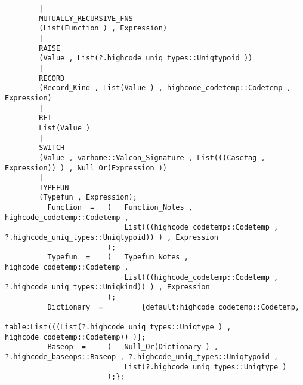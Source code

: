 \begin{verbatim}
        |
        MUTUALLY_RECURSIVE_FNS
        (List(Function ) , Expression)
        |
        RAISE
        (Value , List(?.highcode_uniq_types::Uniqtypoid ))
        |
        RECORD
        (Record_Kind , List(Value ) , highcode_codetemp::Codetemp , Expression)
        |
        RET
        List(Value )
        |
        SWITCH
        (Value , varhome::Valcon_Signature , List(((Casetag , Expression)) ) , Null_Or(Expression ))
        |
        TYPEFUN
        (Typefun , Expression);
          Function  =   (   Function_Notes , highcode_codetemp::Codetemp ,
                            List(((highcode_codetemp::Codetemp , ?.highcode_uniq_types::Uniqtypoid)) ) , Expression
                        );
          Typefun  =    (   Typefun_Notes , highcode_codetemp::Codetemp ,
                            List(((highcode_codetemp::Codetemp , ?.highcode_uniq_types::Uniqkind)) ) , Expression
                        );
          Dictionary  =         {default:highcode_codetemp::Codetemp,
                                table:List(((List(?.highcode_uniq_types::Uniqtype ) , highcode_codetemp::Codetemp)) )};
          Baseop  =     (   Null_Or(Dictionary ) , ?.highcode_baseops::Baseop , ?.highcode_uniq_types::Uniqtypoid ,
                            List(?.highcode_uniq_types::Uniqtype )
                        );};
\end{verbatim}
